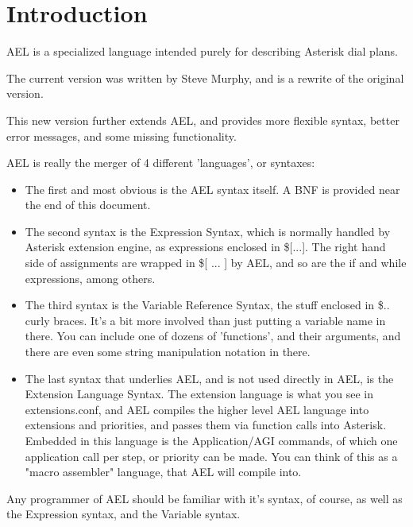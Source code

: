 \section{Introduction}

AEL is a specialized language intended purely for 
describing Asterisk dial plans.

The current version was written by Steve Murphy, and is a rewrite of 
the original version.

This new version further extends AEL, and
provides more flexible syntax, better error messages, and some missing
functionality.

AEL is really the merger of 4 different 'languages', or syntaxes:

\begin{itemize}
    \item The first and most obvious is the AEL syntax itself. A BNF is
      provided near the end of this document.

    \item The second syntax is the Expression Syntax, which is normally
     handled by Asterisk extension engine, as expressions enclosed in
     \$[...]. The right hand side of assignments are wrapped in \$[ ... ] 
     by AEL, and so are the if and while expressions, among others.

    \item The third syntax is the Variable Reference Syntax, the stuff
      enclosed in \${..} curly braces. It's a bit more involved than just
      putting a variable name in there. You can include one of dozens of
      'functions', and their arguments, and there are even some string
      manipulation notation in there.

    \item The last syntax that underlies AEL, and is not used
      directly in AEL, is the Extension Language Syntax. The
      extension language is what you see in extensions.conf, and AEL
      compiles the higher level AEL language into extensions and
      priorities, and passes them via function calls into
      Asterisk. Embedded in this language is the Application/AGI
      commands, of which one application call per step, or priority
      can be made. You can think of this as a "macro assembler"
      language, that AEL will compile into.
\end{itemize}

Any programmer of AEL should be familiar with it's syntax, of course,
as well as the Expression syntax, and the Variable syntax.


